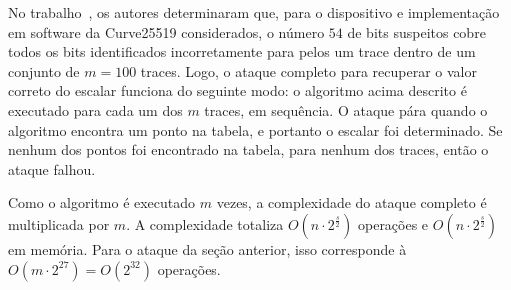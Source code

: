 No trabalho~\cite{Nascimento2016_SAC}, os autores determinaram que, para o dispositivo e implementação em software da Curve25519 considerados, o número $54$ de bits suspeitos cobre todos os bits identificados incorretamente para pelos um trace dentro de um conjunto de $m = 100$ traces.
Logo, o ataque completo para recuperar o valor correto do escalar funciona do seguinte modo:
o algoritmo acima descrito é executado para cada um dos $m$ traces, em sequência. O ataque pára quando o algoritmo encontra um ponto na tabela, e portanto o escalar foi determinado. Se nenhum dos pontos foi encontrado na tabela, para nenhum dos traces, então o ataque falhou.


Como o algoritmo é executado $m$ vezes, a complexidade do ataque completo é multiplicada por $m$. A complexidade totaliza $O(n \cdot 2^{\frac{s}{2}})$ operações e $O(n \cdot 2^{\frac{s}{2}})$ em memória.
Para o ataque da seção anterior, isso corresponde à $O\left(m \cdot 2^{27}\right) = O\left(2^{32}\right)$ operações.


